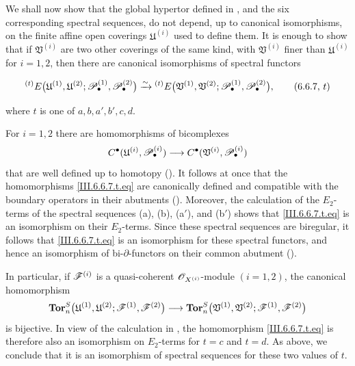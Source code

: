 \begin{env}[6.6.7]
\label{III.6.6.7}
We shall now show that the global hypertor defined in
, and the six corresponding spectral sequences,
do not depend, up to canonical isomorphisms, on the finite affine
open coverings $\mathfrak U^{(i)}$ used to define them.  It is
enough to show that if $\mathfrak V^{(i)}$ are two other
coverings of the same kind, with $\mathfrak V^{(i)}$ finer than
$\mathfrak U^{(i)}$ for $i=1,2$, then there are canonical
isomorphisms of spectral functors
\begin{env}[6.6.7, $t$]
\label{III.6.6.7.t}
\[
  {}^{(t)}E
  \bigl(
    \mathfrak U^{(1)},\mathfrak U^{(2)};
    \mathscr{P}_\bullet^{(1)},\mathscr{P}_\bullet^{(2)}
  \bigr)
  \xrightarrow{\sim}
  {}^{(t)}E
  \bigl(
    \mathfrak V^{(1)},\mathfrak V^{(2)};
    \mathscr{P}_\bullet^{(1)},\mathscr{P}_\bullet^{(2)}
  \bigr),
  \tag{6.6.7, $t$}\label{III.6.6.7.t.eq}
\]
\end{env}
where $t$ is one of $a,b,a',b',c,d$.

For $i=1,2$ there are homomorphisms of bicomplexes
\[
  C^\bullet
  (\mathfrak U^{(i)},\mathscr{P}_\bullet^{(i)})
  \longrightarrow
  C^\bullet
  (\mathfrak V^{(i)},\mathscr{P}_\bullet^{(i)})
\]
that are well defined up to homotopy
().  It follows at once that the
homomorphisms \eqref{III.6.6.7.t.eq} are canonically defined and
compatible with the boundary operators in their abutments
().  Moreover, the calculation of the
$E_2$-terms of the spectral sequences
\textnormal{(a)}, \textnormal{(b)}, \textnormal{(a$'$)}, and
\textnormal{(b$'$)} shows that
\eqref{III.6.6.7.t.eq} is an isomorphism on their $E_2$-terms.
Since these spectral sequences are biregular, it follows that
\eqref{III.6.6.7.t.eq} is an isomorphism for these spectral
functors, and hence an isomorphism of bi-$\partial$-functors on
their common abutment ().

In particular, if $\mathscr{F}^{(i)}$ is a quasi-coherent
$\mathscr{O}_{X^{(i)}}$-module $(i=1,2)$, the canonical homomorphism
\[
  \mathbf{Tor}_n^S
  \bigl(
    \mathfrak U^{(1)},\mathfrak U^{(2)};
    \mathscr{F}^{(1)},\mathscr{F}^{(2)}
  \bigr)
  \longrightarrow
  \mathbf{Tor}_n^S
  \bigl(
    \mathfrak V^{(1)},\mathfrak V^{(2)};
    \mathscr{F}^{(1)},\mathscr{F}^{(2)}
  \bigr)
\]
is bijective.  In view of the calculation in
, the homomorphism
\eqref{III.6.6.7.t.eq} is therefore also an isomorphism on
$E_2$-terms for $t=c$ and $t=d$.  As above, we conclude that it
is an isomorphism of spectral sequences for these two values of
$t$.


\end{env}
